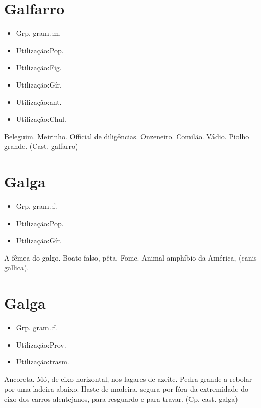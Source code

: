 \section{Galfarro}
\begin{itemize}
\item {Grp. gram.:m.}
\end{itemize}
\begin{itemize}
\item {Utilização:Pop.}
\end{itemize}
\begin{itemize}
\item {Utilização:Fig.}
\end{itemize}
\begin{itemize}
\item {Utilização:Gír.}
\end{itemize}
\begin{itemize}
\item {Utilização:ant.}
\end{itemize}
\begin{itemize}
\item {Utilização:Chul.}
\end{itemize}
Beleguim.
Meirinho.
Official de diligências.
Onzeneiro.
Comilão.
Vádio.
Piolho grande.
(Cast. \textunderscore galfarro\textunderscore )
\section{Galga}
\begin{itemize}
\item {Grp. gram.:f.}
\end{itemize}
\begin{itemize}
\item {Utilização:Pop.}
\end{itemize}
\begin{itemize}
\item {Utilização:Gír.}
\end{itemize}
A fêmea do galgo.
Boato falso, pêta.
Fome.
Animal amphíbio da América, (\textunderscore canis gallica\textunderscore ).
\section{Galga}
\begin{itemize}
\item {Grp. gram.:f.}
\end{itemize}
\begin{itemize}
\item {Utilização:Prov.}
\end{itemize}
\begin{itemize}
\item {Utilização:trasm.}
\end{itemize}
Ancoreta.
Mó, de eixo horizontal, nos lagares de azeite.
Pedra grande a rebolar por uma ladeira abaixo.
Haste de madeira, segura por fóra da extremidade do eixo dos carros alentejanos, para resguardo e para travar.
(Cp. cast. \textunderscore galga\textunderscore )
